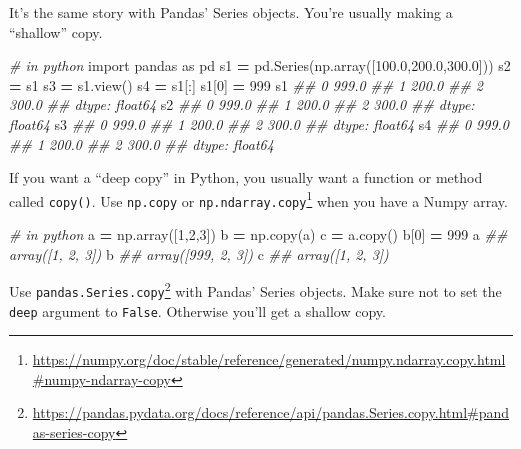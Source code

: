 \documentclass[12pt,krantz2]{krantz}
\makeatletter
\newenvironment{Shaded}{\begin{snugshade}}{\end{snugshade}}
\newcommand{\CommentTok}[1]{\textcolor[rgb]{0.37,0.37,0.37}{\textit{#1}}}
\newcommand{\DecValTok}[1]{\textcolor[rgb]{0.06,0.06,0.06}{#1}}
\newcommand{\FloatTok}[1]{\textcolor[rgb]{0.06,0.06,0.06}{#1}}
\newcommand{\ImportTok}[1]{#1}
\newcommand{\NormalTok}[1]{#1}
\newcommand{\OperatorTok}[1]{\textcolor[rgb]{0.43,0.43,0.43}{\textbf{#1}}}
\renewcommand{\href}[2]{#2\footnote{\url{#1}}}
\newenvironment{kframe}{%
\medskip{}
\setlength{\fboxsep}{.8em}
 \def\at@end@of@kframe{}%
 \ifinner\ifhmode%
  \def\at@end@of@kframe{\end{minipage}}%
  \begin{minipage}{\columnwidth}%
 \fi\fi%
 \def\FrameCommand##1{\hskip\@totalleftmargin \hskip-\fboxsep
 \colorbox{shadecolor}{##1}\hskip-\fboxsep
     \hskip-\linewidth \hskip-\@totalleftmargin \hskip\columnwidth}%
 \MakeFramed {\advance\hsize-\width
   \@totalleftmargin\z@ \linewidth\hsize
   \@setminipage}}%
 {\par\unskip\endMakeFramed%
 \at@end@of@kframe}
\renewenvironment{Shaded}{\begin{kframe}}{\end{kframe}}
\makeatother
\begin{document}
It's the same story with Pandas' Series objects. You're usually making a ``shallow'' copy.

\begin{Shaded}
\begin{Highlighting}[]
\CommentTok{# in python}
\ImportTok{import}\NormalTok{ pandas }\ImportTok{as}\NormalTok{ pd}
\NormalTok{s1 }\OperatorTok{=}\NormalTok{ pd.Series(np.array([}\FloatTok{100.0}\NormalTok{,}\FloatTok{200.0}\NormalTok{,}\FloatTok{300.0}\NormalTok{]))}
\NormalTok{s2 }\OperatorTok{=}\NormalTok{ s1}
\NormalTok{s3 }\OperatorTok{=}\NormalTok{ s1.view()}
\NormalTok{s4 }\OperatorTok{=}\NormalTok{ s1[:]}
\NormalTok{s1[}\DecValTok{0}\NormalTok{] }\OperatorTok{=} \DecValTok{999}
\NormalTok{s1}
\CommentTok{## 0    999.0}
\CommentTok{## 1    200.0}
\CommentTok{## 2    300.0}
\CommentTok{## dtype: float64}
\NormalTok{s2}
\CommentTok{## 0    999.0}
\CommentTok{## 1    200.0}
\CommentTok{## 2    300.0}
\CommentTok{## dtype: float64}
\NormalTok{s3}
\CommentTok{## 0    999.0}
\CommentTok{## 1    200.0}
\CommentTok{## 2    300.0}
\CommentTok{## dtype: float64}
\NormalTok{s4}
\CommentTok{## 0    999.0}
\CommentTok{## 1    200.0}
\CommentTok{## 2    300.0}
\CommentTok{## dtype: float64}
\end{Highlighting}
\end{Shaded}

If you want a ``deep copy'' in Python, you usually want a function or method called \texttt{copy()}. Use \texttt{np.copy} or \href{https://numpy.org/doc/stable/reference/generated/numpy.ndarray.copy.html\#numpy-ndarray-copy}{\texttt{np.ndarray.copy}} when you have a Numpy array.

\begin{Shaded}
\begin{Highlighting}[]
\CommentTok{# in python}
\NormalTok{a }\OperatorTok{=}\NormalTok{ np.array([}\DecValTok{1}\NormalTok{,}\DecValTok{2}\NormalTok{,}\DecValTok{3}\NormalTok{])}
\NormalTok{b }\OperatorTok{=}\NormalTok{ np.copy(a)}
\NormalTok{c }\OperatorTok{=}\NormalTok{ a.copy()}
\NormalTok{b[}\DecValTok{0}\NormalTok{] }\OperatorTok{=} \DecValTok{999}
\NormalTok{a }
\CommentTok{## array([1, 2, 3])}
\NormalTok{b}
\CommentTok{## array([999,   2,   3])}
\NormalTok{c}
\CommentTok{## array([1, 2, 3])}
\end{Highlighting}
\end{Shaded}

Use \href{https://pandas.pydata.org/docs/reference/api/pandas.Series.copy.html\#pandas-series-copy}{\texttt{pandas.Series.copy}} with Pandas' Series objects. Make sure not to set the \texttt{deep} argument to \texttt{False}. Otherwise you'll get a shallow copy.
\end{document}
